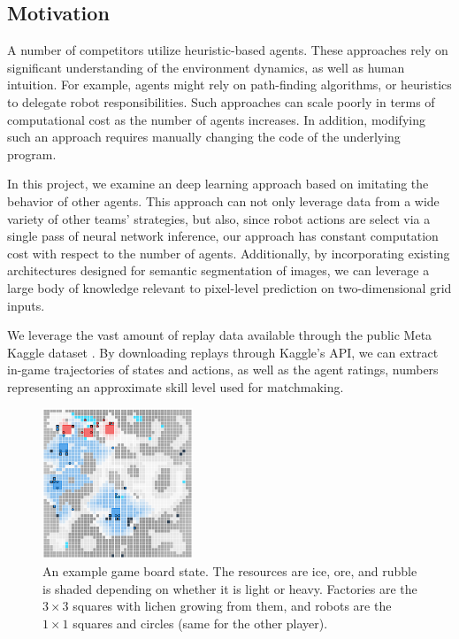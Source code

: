 \documentclass[10pt,twocolumn,letterpaper]{article}
\begin{document}
\subsection{Motivation}
\label{subsec:motivation}

A number of competitors utilize heuristic-based agents.
These approaches rely on significant understanding of
the environment dynamics, as well as human intuition.
For example, agents might rely on path-finding algorithms,
or heuristics to delegate robot responsibilities.
Such approaches can scale poorly in terms of
computational cost as the number of agents increases.
In addition, modifying such an approach requires
manually changing the code of the underlying program.

In this project, we examine an deep learning approach
based on imitating the behavior of other agents.
This approach can not only leverage data from a wide variety of
other teams' strategies, but also, since robot actions are select
via a single pass of neural network inference, our approach has
constant computation cost with respect to the number of agents.
Additionally, by incorporating existing architectures designed for
semantic segmentation of images, we can leverage a large body of knowledge
relevant to pixel-level prediction on two-dimensional grid inputs.

We leverage the vast amount of replay data available
through the public Meta Kaggle dataset \cite{metakaggle}.
By downloading replays through Kaggle's API, we can extract in-game
trajectories of states and actions, as well as the agent ratings,
numbers representing an approximate skill level used for matchmaking.

\begin{figure}[t]
  \centering
  \includegraphics[width=0.4\textwidth]{figures/map.png}
  \caption{%
    An example game board state.
    The resources are \textcolor{ice}{ice}, \textcolor{ore}{ore},
    and rubble is shaded depending on whether it is
    \textcolor{rubblelight!85!black}{light} or \textcolor{rubbledark}{heavy}.
    \textcolor{factory1}{Factories} are the \( 3 \times 3 \) squares with
    \textcolor{factory1}{lichen} growing from them, and robots are the \( 1
    \times 1 \) \textcolor{robot1}{squares} and \textcolor{robot1}{circles}
    (same for the \textcolor{factory2}{other} player).
  }
  \label{fig:map}
\end{figure}
\end{document}
